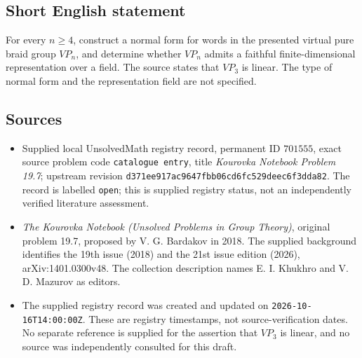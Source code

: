 \documentclass[11pt]{article}
\begin{document}
\subsection{Short English statement}
For every \(n\geq4\), construct a normal form for words in the presented virtual pure braid group \(VP_n\), and determine whether \(VP_n\) admits a faithful finite-dimensional representation over a field. The source states that \(VP_3\) is linear. The type of normal form and the representation field are not specified.
\subsection{Sources}
\begin{itemize}
\item Supplied local UnsolvedMath registry record, permanent ID \(701555\), exact source problem code \texttt{catalogue entry}, title \emph{Kourovka Notebook Problem 19.7}; upstream revision \texttt{d371ee917ac9647fbb06cd6fc529deec6f3dda82}. The record is labelled \texttt{open}; this is supplied registry status, not an independently verified literature assessment.
\item \emph{The Kourovka Notebook (Unsolved Problems in Group Theory)}, original problem 19.7, proposed by V. G. Bardakov in 2018. The supplied background identifies the 19th issue (2018) and the 21st issue edition (2026), arXiv:1401.0300v48. The collection description names E. I. Khukhro and V. D. Mazurov as editors.
\item The supplied registry record was created and updated on \texttt{2026-10-16T14:00:00Z}. These are registry timestamps, not source-verification dates. No separate reference is supplied for the assertion that \(VP_3\) is linear, and no source was independently consulted for this draft.
\end{itemize}
\end{document}
